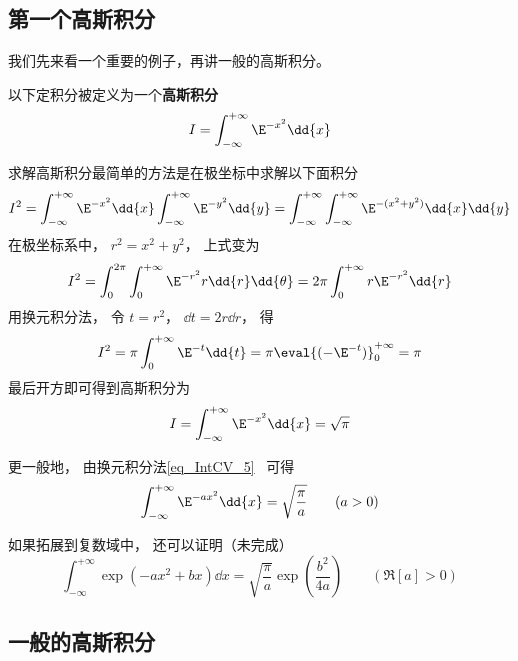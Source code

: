

\subsection{第一个高斯积分}

我们先来看一个重要的例子，再讲一般的高斯积分。

以下定积分被定义为一个\textbf{高斯积分}
\begin{equation}
I = \int_{-\infty}^{+\infty} \E^{-x^2}\dd{x}
\end{equation}

求解高斯积分最简单的方法是在极坐标中求解以下面积分
\begin{equation}
I^2 = \int_{-\infty}^{+\infty} \E^{-x^2}\dd{x} \int_{-\infty}^{+\infty} \E^{-y^2}\dd{y}
=\int_{-\infty}^{+\infty}\int_{-\infty}^{+\infty} \E^{-(x^2 + y^2)} \dd{x}\dd{y}
\end{equation}
在极坐标系中， $r^2 = x^2 + y^2$， 上式变为
\begin{equation}
I^2 = \int_0^{2\pi} \int_0^{+\infty} \E^{-r^2} r\dd{r}\dd{\theta}
= 2\pi \int_0^{+\infty} r\E^{-r^2} \dd{r}
\end{equation}
用换元积分法， 令 $t = r^2$， $\dd{t} = 2r\dd{r}$， 得
\begin{equation}
I^2 = \pi \int_0^{+\infty} \E^{-t} \dd{t} = \pi \eval{(-\E^{-t})}_0^{+\infty} = \pi
\end{equation}
最后开方即可得到高斯积分为
\begin{equation}\label{eq_GsInt_1}
I = \int_{-\infty}^{+\infty} \E^{-x^2}\dd{x} = \sqrt{\pi}
\end{equation}

更一般地， 由换元积分法\autoref{eq_IntCV_5}~ 可得
\begin{equation}\label{eq_GsInt_5}
\int_{-\infty}^{+\infty} \E^{-a x^2}\dd{x} = \sqrt{\frac{\pi}{a}} \qquad (a > 0)
\end{equation}

如果拓展到复数域中， 还可以证明（未完成）
\begin{equation}\label{eq_GsInt_4}
\int_{-\infty}^{+\infty} \exp(-ax^2 + bx) \dd{x} = \sqrt{\frac{\pi}{a}} \exp(\frac{b^2}{4a}) \qquad (\Re[a] > 0)
\end{equation}


\subsection{一般的高斯积分}

